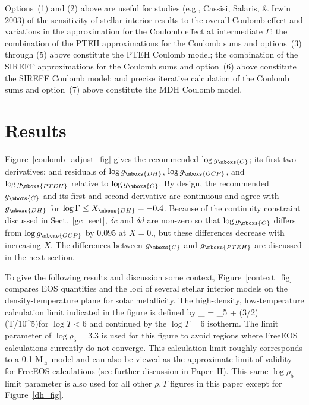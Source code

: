 Options~(1) and (2) above are useful for studies (e.g., Cassisi, Salaris, \&
Irwin 2003) of the sensitivity of stellar-interior results to the overall
Coulomb effect and variations in the approximation for the Coulomb effect at
intermediate $\Gamma$; the combination of the PTEH approximations for the
Coulomb sums and options~(3) through (5) above constitute the PTEH Coulomb
model; the combination of the SIREFF approximations for the Coulomb sums and
option~(6) above constitute the SIREFF Coulomb model; and precise iterative
calculation of the Coulomb sums and option~(7) above constitute the MDH
Coulomb model.

\section{Results }

Figure~\ref{coulomb_adjust_fig} gives the recommended $\log g_{\mboxs{C}}$;
its first two derivatives; and residuals of $\log g_{\mboxs{DH}}$, $\log
g_{\mboxs{OCP}}$, and $\log g_{\mboxs{PTEH}}$ relative to $\log
g_{\mboxs{C}}$.  By design, the recommended $g_{\mboxs{C}}$ and its first
and second derivative are continuous and agree with $g_{\mboxs{DH}}$ for
$\log \Gamma \le X_{\mboxs{DH}} = -0.4$.  Because of the continuity
constraint discussed in Sect.~\ref{gc_sect}, $\delta c$ and $\delta d$ are
non-zero so that $\log g_{\mboxs{C}}$ differs from $\log g_{\mboxs{OCP}}$ by
0.095 at $X=0.$, but these differences decrease with increasing $X$.  The
differences between $g_{\mboxs{C}}$ and $g_{\mboxs{PTEH}}$ are discussed in
the next section.

To give the following results and discussion some context,
Figure~\ref{context_fig} compares EOS quantities and the loci of several
stellar interior models on the density-temperature plane for solar
metallicity. The high-density, low-temperature calculation limit indicated
in the figure is defined by \be \log \rho_{} = \log \rho_5 +
(3/2) \log(T/10^5)\ee for $\log T < 6$ and continued by the $\log T = 6$
isotherm. The limit parameter of $\log \rho_5 = 3.3$ is used for this figure
to avoid regions where FreeEOS calculations currently do not converge. This
calculation limit roughly corresponds to a 0.1-M$_\sun$ model and can also
be viewed as the approximate limit of validity for FreeEOS calculations (see
further discussion in Paper~II).  This same $\log \rho_5$ limit parameter is
also used for all other $\rho,T$ figures in this paper except for
Figure~\ref{dh_fig}.

